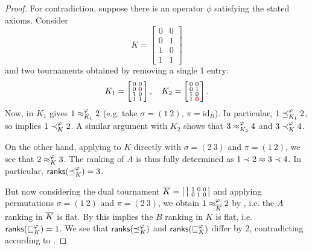 \begin{proof}

    For contradiction, suppose there is an operator $\phi$ satisfying the
    stated axioms. Consider
    \[
        K = \left[\begin{smallmatrix}
            0 & 0 \\
            0 & 1 \\
            1 & 0 \\
            1 & 1
        \end{smallmatrix}\right]
    \]
    and two tournaments obtained by removing a single 1 entry:
    \[
        K_1 = \left[\begin{smallmatrix}
            0 & 0 \\
            0 & \bm{{\color{red}0}} \\
            1 & 0 \\
            1 & 1
        \end{smallmatrix}\right],
        \quad
        K_2 = \left[\begin{smallmatrix}
            0 & 0 \\
            0 & 1 \\
            1 & 0 \\
            1 & \bm{{\color{red}0}}
        \end{smallmatrix}\right].
    \]
    Now, \anon{} in $K_1$ gives $1 \approx_{K_1}^\varphi 2$ (e.g. take
    $\sigma = (1\ 2)$, $\pi = \text{id}_B$). In particular, $1 \preceq_{K_1}^\varphi
    2$, so \posresp{} implies $1 \prec_K^\varphi 2$. A similar argument
    with $K_2$ shows that $3 \approx_{K_2}^\varphi 4$ and $3 \prec_K^\varphi 4$.

    On the other hand, applying \anon{} to $K$ directly with $\sigma =
    (2\ 3)$ and $\pi = (1\ 2)$, we see that $2 \approx_K^\varphi 3$. The ranking of
    $A$ is thus fully determined as $1 \prec 2 \approx 3 \prec 4$. In particular,
    $\mathsf{ranks}({\preceq_K^\varphi}) = 3$.

    But now considering the dual tournament ${\overline{K}} =
    \left[\begin{smallmatrix} 1&1&0&0 \\ 1&0&1&0 \end{smallmatrix}\right]$ and
    applying permutations $\sigma = (1\ 2)$ and $\pi = (2\ 3)$, we obtain $1
    \approx_{{\overline{K}}}^\varphi 2$ by \anon{}, i.e. the $A$ ranking in
    ${\overline{K}}$ is flat. By \dualaxiom{} this implies the $B$ ranking in $K$
    is flat, i.e. $\mathsf{ranks}({\sqsubseteq_K^\varphi}) = 1$. We see that $\mathsf{ranks}({\preceq_K^\varphi})$
    and $\mathsf{ranks}({\sqsubseteq_K^\varphi})$ differ by 2, contradicting \chaindef{}
    according to .
\end{proof}

